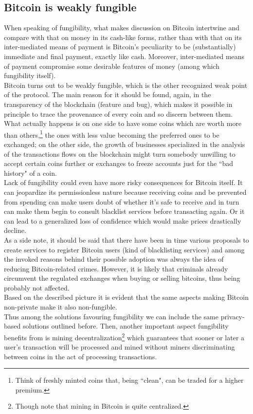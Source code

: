 \subsection{Bitcoin is weakly fungible}
When speaking of fungibility, what makes discussion on Bitcoin intertwine and compare with that on money in its cash-like forms, rather than with that on its inter-mediated means of payment is Bitcoin's peculiarity to be (substantially) immediate and final payment, exactly like cash. Moreover, inter-mediated means of payment compromise some desirable features of money (among which fungibility itself).\\
Bitcoin turns out to be weakly fungible, which is the other recognized weak point of the protocol. The main reason for it should be found, again, in the transparency of the blockchain (feature and bug), which makes it possible in principle to trace the provenance of every coin and so discern between them. What actually happens is on one side to have some coins which are worth more than others,\footnote{Think of freshly minted coins that, being ``clean", can be traded for a higher premium.} the ones with less value becoming the preferred ones to be exchanged; on the other side, the growth of businesses specialized in the analysis of the transactions flows on the blockchain might turn somebody unwilling to accept certain coins further or exchanges to freeze accounts just for the ``bad history" of a coin.\\
Lack of fungibility could even have more risky consequences for Bitcoin itself. It can jeopardize its permissionless nature because receiving coins and be prevented from spending can make users doubt of whether it's safe to receive and in turn can make them begin to consult blacklist services before transacting again. Or it can lead to a generalized loss of confidence which would make prices drastically decline.\\
As a side note, it should be said that there have been in time various proposals to create services to register Bitcoin users (kind of blacklisting services) and among the invoked reasons behind their possible adoption was always the idea of reducing Bitcoin-related crimes. However, it is likely that criminals already circumvent the regulated exchanges when buying or selling bitcoins, thus being probably not affected.\\
Based on the described picture it is evident that the same aspects making Bitcoin non-private make it also non-fungible.\\
Thus among the solutions favouring fungibility we can include the same privacy-based solutions outlined before. Then, another important aspect fungibility benefits from is mining decentralization\footnote{Though note that mining in Bitcoin is quite centralized.} which guarantees that sooner or later a user's transaction will be processed and mined without miners discriminating between coins in the act of processing transactions.

